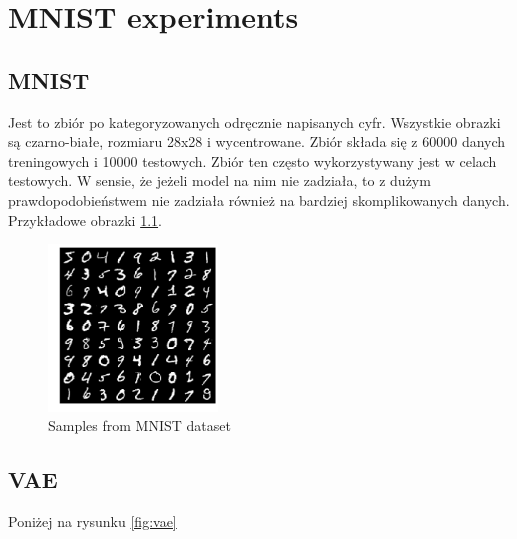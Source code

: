 \chapter{MNIST experiments}

\section{MNIST}

Jest to zbiór po kategoryzowanych odręcznie napisanych cyfr. Wszystkie obrazki są czarno-białe, rozmiaru 28x28 i wycentrowane. Zbiór składa się z 60000 danych treningowych i 10000 testowych. Zbiór ten często wykorzystywany jest w celach testowych. W sensie, że jeżeli model na nim nie zadziała, to z dużym prawdopodobieństwem nie zadziała również na bardziej skomplikowanych danych. Przykładowe obrazki \ref{fig:mnist}.

\begin{figure}[h!]
    \centering
    \includegraphics[width=0.4\textwidth]{images/mnist}
    \caption{Samples from MNIST dataset}
    \label{fig:mnist}
\end{figure}

\section{VAE}

Poniżej na rysunku \ref{fig:vae}


